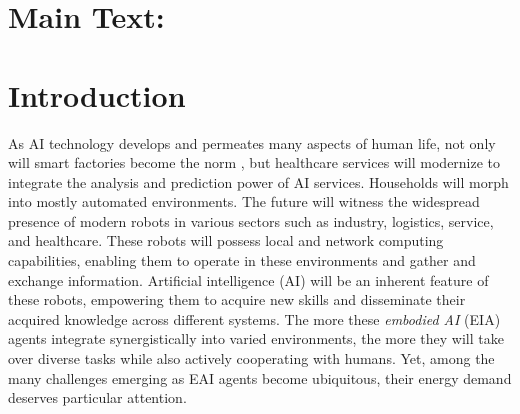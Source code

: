 \documentclass[12pt]{article}
\renewcommand{\emph}[1]{\textit{#1}}
\begin{document}

\newcommand{\beginsupplement}
{%
	\setcounter{table}{0}
	\renewcommand{\thesection}{S\arabic{section}}
	\renewcommand{\thetable}{S\arabic{table}}%
	\setcounter{figure}{0}
	\renewcommand{\thefigure}{S\arabic{figure}}%
}


\section*{Main Text:}

\section*{Introduction}\label{sec:intro}
As AI technology develops and permeates many aspects of human life, not only will smart factories become the norm \cite{Szczepanski2019Economicimpactsartificial}, but healthcare services will modernize to integrate the analysis and prediction power of AI services. Households will morph into mostly automated environments. The future will witness the widespread presence of modern robots in various sectors such as industry, logistics, service, and healthcare. These robots will possess local and network computing capabilities, enabling them to operate in these environments and gather and exchange information. Artificial intelligence (AI) will be an inherent feature of these robots, empowering them to acquire new skills and disseminate their acquired knowledge across different systems. The more these \emph{embodied AI} (EIA) agents integrate synergistically into varied environments, the more they will take over diverse tasks while also actively cooperating with humans. Yet, among the many challenges emerging as EAI agents become ubiquitous, their energy demand deserves particular attention.
\end{document}
